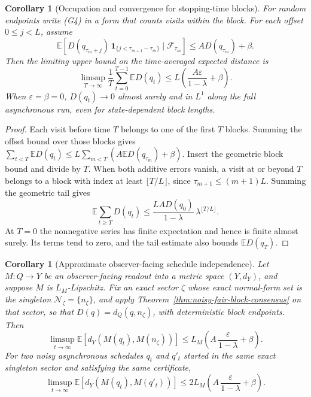 \documentclass[11pt]{article}
\newtheorem{corollary}[theorem]{Corollary}
\theoremstyle{remark}
\theoremstyle{plain}
\begin{document}
\begin{corollary}[Occupation and convergence for stopping-time blocks]
For random endpoints write (G4) in a form that counts visits within the
block. For each offset \(0\le j<L\), assume
\[
\mathbb E\!\left[D(q_{\tau_m+j})\,
  \mathbf1_{\{j<\tau_{m+1}-\tau_m\}}\mid\mathcal F_{\tau_m}\right]
\le A D(q_{\tau_m})+\beta .
\]
Then the limiting upper bound on the time-averaged expected distance is
\[
\limsup_{T\to\infty}\frac1T\sum_{t=0}^{T-1}\mathbb E D(q_t)
\le L\left(\frac{A\varepsilon}{1-\lambda}+\beta\right).
\]
When \(\varepsilon=\beta=0\), \(D(q_t)\to0\) almost surely and in
\(L^1\) along the full asynchronous run, even for state-dependent block
lengths.
\end{corollary}

\begin{proof}
Each visit before time \(T\) belongs to one of the first \(T\) blocks.
Summing the offset bound over those blocks gives
\(\sum_{t<T}\mathbb E D(q_t)\le
L\sum_{m<T}(A\mathbb E D(q_{\tau_m})+\beta)\).
Insert the geometric block bound and divide by \(T\).
When both additive errors vanish, a visit at or beyond \(T\) belongs
to a block with index at least \(\lfloor T/L\rfloor\), since
\(\tau_{m+1}\le(m+1)L\). Summing the geometric tail gives
\[
\mathbb E\sum_{t\ge T}D(q_t)
\le \frac{LA D(q_0)}{1-\lambda}\,\lambda^{\lfloor T/L\rfloor}.
\]
At \(T=0\) the nonnegative series has finite expectation and hence is
finite almost surely. Its terms tend to zero, and the tail estimate
also bounds \(\mathbb E D(q_T)\).
\end{proof}

\begin{corollary}[Approximate observer-facing schedule independence]
\label{cor:approx-schedule-independence}
Let \(M:Q\to Y\) be an observer-facing readout into a metric space \((Y,d_Y)\), and suppose \(M\)
is \(L_M\)-Lipschitz. Fix an exact sector \(\zeta\) whose exact normal-form set is the singleton
\(\mathcal N_\zeta=\{n_\zeta\}\), and apply Theorem~\ref{thm:noisy-fair-block-consensus} on that
sector, so that \(D(q)=d_Q(q,n_\zeta)\), with deterministic block endpoints.
Then
\[
\limsup_{t\to\infty}
\mathbb E\!\left[
d_Y(M(q_t),M(n_\zeta))
\right]
\le
L_M\left(A\,\frac{\varepsilon}{1-\lambda}+\beta\right).
\]
For two noisy asynchronous schedules \(q_t\) and \(q'_t\) started in the same exact singleton
sector and satisfying the same certificate,
\[
\limsup_{t\to\infty}
\mathbb E\!\left[
d_Y(M(q_t),M(q'_t))
\right]
\le
2L_M\left(A\,\frac{\varepsilon}{1-\lambda}+\beta\right).
\]
\end{corollary}
\end{document}
